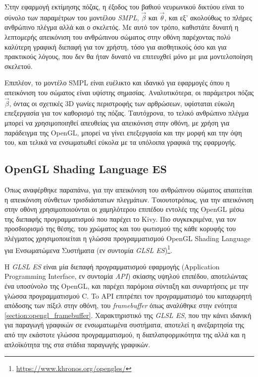 Στην εφαρμογή εκτίμησης πόζας, η έξοδος του βαθιού νευρωνικού δικτύου είναι το σύνολο των παραμέτρων του μοντέλου \textsl{SMPL}, $\vec{\beta}$ και $\vec{\theta}$, και εξ' ακολούθως το πλήρες ανθρώπινο πλέγμα αλλά και ο σκελετός. Με αυτό τον τρόπο, καθιστάτε δυνατή η λεπτομερής απεικόνιση του ανθρώπινου σώματος στην οθόνη παρέχοντας πολύ καλύτερη γραφική διεπαφή για τον χρήστη, τόσο για αισθητικούς όσο και για πρακτικούς λόγους, που δεν θα ήταν δυνατό να επιτευχθεί μόνο με μια μοντελοποίηση σκελετού.

Επιπλέον, το μοντέλο SMPL είναι ευέλικτο και ιδανικό για εφαρμογές όπου η απεικόνιση του σώματος είναι υψίστης σημασίας. Αναλυτικότερα, οι παράμετροι πόζας $\vec{\beta}$, όντας οι σχετικές 3D γωνίες περιστροφής των αρθρώσεων, υφίσταται εύκολη επεξεργασία για τον καθορισμό της πόζας. Ταυτόχρονα, το τελικό ανθρώπινο πλέγμα μπορεί να χρησιμοποιηθεί απευθείας για απεικόνιση στην οθόνη, με χρήση για παράδειγμα της OpenGL, μπορεί να γίνει επεξεργασία και την μορφή και την όψη του, και τελικά να ενσωματωθεί εύκολα με τα υπόλοιπα γραφικά της εφαρμογής.


\subsection{OpenGL Shading Language ES}
Όπως αναφέρθηκε παραπάνω, για την απεικόνιση του ανθρώπινου σώματος απαιτείται η απεικόνιση σύνθετων τρισδιάστατων πλεγμάτων. Τοιουτοτρόπως, για την απεικόνιση στην οθόνη χρησιμοποιούνται οι χαμηλότερου επιπέδου εντολές της OpenGL μέσω της διεπαφής προγραμματισμού που παρέχει το Kivy. Πιο συγκεκριμένα, για τον προσδιορισμό της θέσης, του χρώματος και του φωτισμού της κάθε κορυφής του πλέγματος χρησιμοποιείται η γλώσσα προγραμματισμού OpenGL Shading Language για Ενσωματώμενα Συστήματα (εν συντομία \textsl{GLSL ES})\footnote{\href{https://www.khronos.org/opengles/}{https://www.khronos.org/opengles/}}.

H \textsl{GLSL ES} είναι μία διεπαφή προγραμματισμού εφαρμογής (Application Programming Interface, εν συντομία \textsl{API}) σκίασης υψηλού επιπέδου, αποτελώντας ένα υποσύνολο της OpenGL, και παρέχει παρόμοια σύνταξη και συναρτήσεις με την γλώσσα προγραμματισμού C. To API επιτρέπει τον προγραμματισμό του καταχωρητή απόδοσης των πίξελ στην οθόνη, του \textsl{framebuffer} όπως αναλύθηκε στην ενότητα \ref{section:opengl_framebuffer}. Χαρακτηριστικό της \textsl{GLSL ES}, που την κάνει ιδανική για παραγωγή γραφικών σε ενσωματωμένα συστήματα, αποτελεί η ανεξαρτησία της από την εκάστοτε γλώσσα προγραμματισμού, η διαπλατφορμικότητα της αλλά και η απλοϊκότητα της στα στάδια παραγωγής γραφικών.

